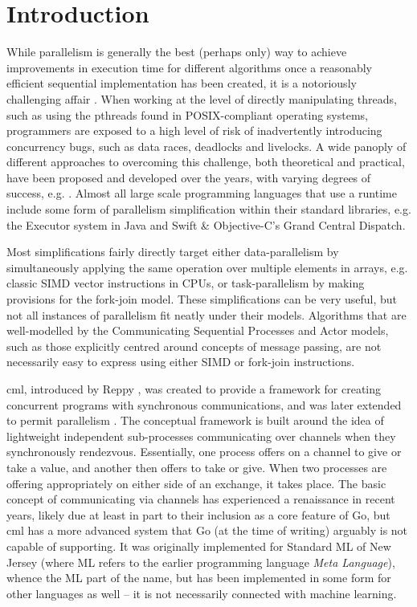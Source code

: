 \section{Introduction}
While parallelism is generally the best (perhaps only) way to achieve improvements in execution time for different algorithms once a reasonably efficient sequential implementation has been created, it is a notoriously challenging affair \cite{Shun2017}.  When working at the level of directly manipulating threads, such as using the pthreads found in POSIX-compliant operating systems, programmers are exposed to a high level of risk of inadvertently introducing concurrency bugs, such as data races, deadlocks and livelocks.  A wide panoply of different approaches to overcoming this challenge, both theoretical and practical, have been proposed and developed over the years, with varying degrees of success, e.g. \cite{Boyapati2002,Bocq2012,Seinstra2004}.  Almost all large scale programming languages that use a runtime include some form of parallelism simplification within their standard libraries, e.g. the Executor system in Java and Swift \& Objective-C's Grand Central Dispatch.

Most simplifications fairly directly target either data-parallelism by simultaneously applying the same operation over multiple elements in arrays, e.g. classic SIMD vector instructions in CPUs, or task-parallelism by making provisions for the fork-join model.  These simplifications can be very useful, but not all instances of parallelism fit neatly under their models.  Algorithms that are well-modelled by the Communicating Sequential Processes \cite{Hoare1985} and Actor \cite{Agha1997} models, such as those explicitly centred around concepts of message passing, are not necessarily easy to express using either SIMD or fork-join instructions.

\Gls{cml}, introduced by Reppy \cite{Reppy1991}, was created to provide a framework for creating concurrent programs with synchronous communications, and was later extended to permit parallelism \cite{Reppy2009a}.  The conceptual framework is built around the idea of lightweight independent sub-processes communicating over channels when they synchronously rendezvous.  Essentially, one process offers on a channel to give or take a value, and another then offers to take or give.  When two processes are offering appropriately on either side of an exchange, it takes place.  The basic concept of communicating via channels has experienced a renaissance in recent years, likely due at least in part to their inclusion as a core feature of Go, but \gls{cml} has a more advanced system that Go (at the time of writing) arguably is not capable of supporting.  It was originally implemented for Standard ML of New Jersey (where ML refers to the earlier programming language \textit{Meta Language}), whence the ML part of the name, but has been implemented in some form for other languages as well -- it is not necessarily connected with machine learning.

